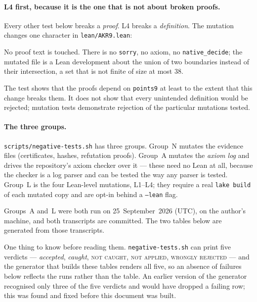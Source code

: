 \documentclass[11pt]{article}
\newcommand{\code}[1]{\texttt{\small #1}}
\newenvironment{trustbox}%
  {\par\medskip\setlength{\fboxsep}{9pt}%
   \begin{lrbox}{\trustboxbuf}%
   \begin{minipage}{\dimexpr\textwidth-2\fboxsep-2\fboxrule\relax}}%
  {\end{minipage}\end{lrbox}%
   \noindent\fcolorbox{black!35}{black!4}{\usebox{\trustboxbuf}}\par\medskip}
\begin{document}
\paragraph{L4 first, because it is the one that is not about broken proofs.}
Every other test below breaks a \emph{proof}. L4 breaks a \emph{definition}.
The mutation changes one character in \code{lean/AKR9.lean}:

\begin{trustbox}

\end{trustbox}

\noindent No proof text is touched. There is no \code{sorry}, no axiom, no
\code{native\_decide}; the mutated file is a Lean development about the union
of two boundaries instead of their intersection, a set that is not finite of
size at most 38. \Lfourreq

The test shows that the proofs depend on \code{points9} at least to the extent
that this change breaks them. It does not show that every unintended
definition would be rejected; mutation tests demonstrate rejection of the
particular mutations tested. \Lfourupshot

\paragraph{The three groups.}
\code{scripts/negative-tests.sh} has three groups. Group~N mutates the
evidence files (certificates, hashes, refutation proofs). Group~A mutates the
\emph{axiom log} and drives the repository's axiom checker over it --- these
need no Lean at all, because the checker is a log parser and can be tested the
way any parser is tested. Group~L is the four Lean-level mutations, L1--L4;
they require a real \code{lake build} of each mutated copy and are opt-in
behind a \code{--lean} flag.

\smallskip
\noindent Groups~A and~L were both run on 25~September~2026 (UTC), on the
author's machine, and both transcripts are committed. The two tables below are
generated from those transcripts.

\smallskip
\noindent One thing to know before reading them. \code{negative-tests.sh} can
print five verdicts --- \emph{accepted}, \emph{caught}, \textsc{not caught},
\textsc{not applied}, \textsc{wrongly rejected} --- and the generator that
builds these tables renders all five, so an absence of failures below reflects
the runs rather than the table. An earlier version of the generator
recognised only three of the five verdicts and would have dropped a failing
row; this was found and fixed before this document was built.
\end{document}
